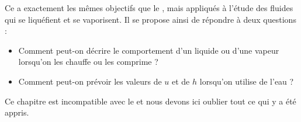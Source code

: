 Ce \courscinqshort a exactement les mêmes objectifs que le \coursquatre, mais appliqués à l’étude des fluides qui se liquéfient et se vaporisent. Il se propose ainsi de répondre à deux questions :
\begin{itemize}
	\item Comment peut-on décrire le comportement d’un liquide ou d’une vapeur lorsqu’on les chauffe ou les comprime ?
	\item Comment peut-on prévoir les valeurs de $u$ et de $h$ lorsqu’on utilise de l’eau ?
\end{itemize}
Ce chapitre est incompatible avec le \coursquatre et nous devons ici oublier tout ce qui y a été appris.
